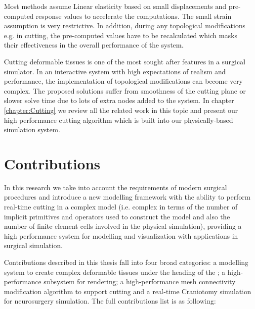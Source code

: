 Most methods assume Linear elasticity based on small displacements and pre-computed 
response values to accelerate the computations. The small strain assumption is very restrictive. In 
addition, during any topological modifications e.g. in cutting, the pre-computed values 
have to be recalculated which masks their effectiveness in the overall performance of the system.

Cutting deformable tissues is one of the most sought after features in a surgical simulator. In an interactive 
system with high expectations of realism and performance, the implementation of topological 
modifications can become very complex. The proposed solutions suffer from smoothness of the cutting 
plane or slower solve time due to lots of extra nodes added to the system. In chapter 
\ref{chapter:Cutting} we review all the related work in this topic and present our high performance 
cutting algorithm which is built into our physically-based simulation system.


\section{Contributions}
\label{sec:contributions}
In this research we take into account the requirements of modern surgical procedures and introduce a 
new modelling framework with the ability to perform real-time cutting in a complex model (i.e. complex
in terms of the number of implicit primitives and operators used to construct the model 
and also the number of finite element cells involved in the physical simulation), providing a high 
performance system for modelling and visualization with applications in surgical simulation. 

Contributions described in this thesis fall into four broad categories: a modelling system to create 
complex deformable tissues under the heading of the \blob; a high-performance subsystem for 
rendering; a high-performance mesh connectivity modification algorithm to support cutting and a  
real-time Craniotomy simulation for neurosurgery simulation. The full contributions list is as 
following:

